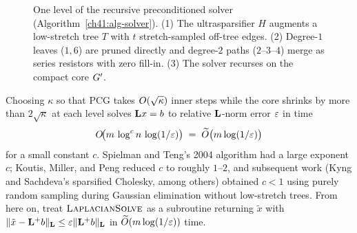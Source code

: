 \begin{figure}[htbp]
\caption{One level of the recursive preconditioned solver (Algorithm~\ref{ch41:alg-solver}). (1) The ultrasparsifier $H$ augments a low-stretch tree $T$ with $t$ stretch-sampled off-tree edges. (2) Degree-$1$ leaves ($1,6$) are pruned directly and degree-$2$ paths ($2$--$3$--$4$) merge as series resistors with zero fill-in. (3) The solver recurses on the compact core $G'$.}
\label{ch41:fig-ultrasparsifier-elim}
\end{figure}

\begin{complexitybox}
Choosing $\kappa$ so that PCG takes $O(\sqrt\kappa)$ inner steps while the core shrinks by more than $2\sqrt{\kappa}$ at each level solves $\mathbf{L} x = b$ to relative $\mathbf{L}$-norm error $\varepsilon$ in time
\[
  O\!\bigl(m\,\log^{c} n\,\log(1/\varepsilon)\bigr) \;=\; \widetilde{O}\bigl(m\log(1/\varepsilon)\bigr)
\]
for a small constant $c$. Spielman and Teng's 2004 algorithm had a large exponent $c$; Koutis, Miller, and Peng reduced $c$ to roughly $1$--$2$, and subsequent work (Kyng and Sachdeva's sparsified Cholesky, among others) obtained $c < 1$ using purely random sampling during Gaussian elimination without low-stretch trees. From here on, treat $\textsc{LaplacianSolve}$ as a subroutine returning $\tilde{x}$ with $\lVert\tilde{x}-\mathbf{L}^{+}b\rVert_{\mathbf{L}}\le\varepsilon\lVert\mathbf{L}^{+}b\rVert_{\mathbf{L}}$ in $\widetilde{O}(m\log(1/\varepsilon))$ time.
\end{complexitybox}

